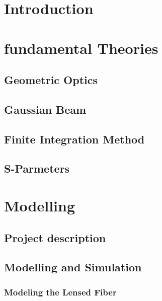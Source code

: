 
\chapter{Introduction}



\chapter{fundamental Theories}
\label{chp:background}

\section{Geometric Optics}
\label{sect:background_optics}


\section{Gaussian Beam}


\section{Finite Integration Method}



\section{S-Parmeters}


\chapter{Modelling}
\label{chp:model}

\section{Project description}

\section{Modelling and Simulation}

\subsection{Modeling the Lensed Fiber}
\label{sect:model_model_model_TLF}

